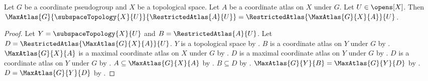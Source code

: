 \begin{theorem}\label{restricted_atlas_maximalization}
    Let $G$ be a coordinate pseudogroup and $X$ be a topological space.
    Let $A$ be a coordinate atlas on $X$ under $G$.
    Let $U\in\opens[X]$.
    Then $\MaxAtlas{G}{\subspaceTopology{X}{U}}{\RestrictedAtlas{A}{U}}
        =\RestrictedAtlas{\MaxAtlas{G}{X}{A}}{U}$.
\end{theorem}
\begin{proof}
    Let $Y=\subspaceTopology{X}{U}$ and $B=\RestrictedAtlas{A}{U}$.
    Let $D=\RestrictedAtlas{\MaxAtlas{G}{X}{A}}{U}$.
    $Y$ is a topological space by .
    $B$ is a coordinate atlas on $Y$ under $G$ by .
    $\MaxAtlas{G}{X}{A}$ is a maximal coordinate atlas on $X$ under $G$ by
        .
    $D$ is a maximal coordinate atlas on $Y$ under $G$ by
        .
    $D$ is a coordinate atlas on $Y$ under $G$ by .
    $A\subseteq\MaxAtlas{G}{X}{A}$ by .
    $B\subseteq D$ by .
    $\MaxAtlas{G}{Y}{B}=\MaxAtlas{G}{Y}{D}$ by .
    $D=\MaxAtlas{G}{Y}{D}$ by .
\end{proof}
